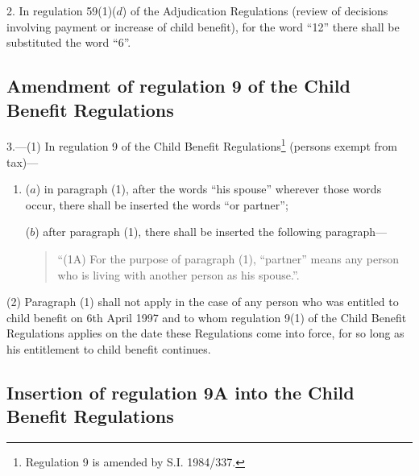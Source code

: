 \documentclass[12pt,a4paper]{article}
\begin{document}
2.  In regulation 59(1)($d$) of the Adjudication Regulations (review of decisions involving payment or increase of child benefit), for the word “12” there shall be substituted the word “6”.

\subsection[3. Amendment of regulation 9 of the Child Benefit Regulations]{Amendment of regulation 9 of the Child Benefit Regulations}

3.—(1) In regulation 9 of the Child Benefit Regulations\footnote{\frenchspacing Regulation 9 is amended by S.I. 1984/337.} (persons exempt from tax)—
\begin{enumerate}\item[]
($a$) in paragraph (1), after the words “his spouse” wherever those words occur, there shall be inserted the words “or partner”;

($b$) after paragraph (1), there shall be inserted the following paragraph—
\begin{quotation}
\begin{sloppypar}
“(1A) For the purpose of paragraph (1), “partner” means any person who is living with another person as his spouse.”.
\end{sloppypar}
\end{quotation}
\end{enumerate}

(2) Paragraph (1) shall not apply in the case of any person who was entitled to child benefit on 6th April 1997 and to whom regulation 9(1) of the Child Benefit Regulations applies on the date these Regulations come into force, for so long as his entitlement to child benefit continues.

\subsection[4. Insertion of regulation 9A into the Child Benefit Regulations]{Insertion of regulation 9A into the Child Benefit Regulations}
\end{document}
